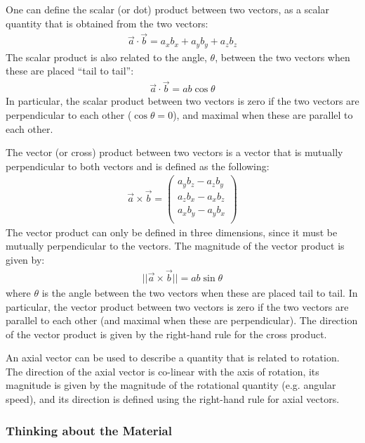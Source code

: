 One can define the scalar (or dot) product between two vectors, as a scalar quantity that is obtained from the two vectors:
\begin{align*}
\vec a \cdot \vec b = a_xb_x + a_yb_y + a_zb_z
\end{align*}
The scalar product is also related to the angle, $\theta$, between the two vectors when these are placed ``tail to tail'':
\begin{align*}
\vec a \cdot \vec b = ab\cos\theta
\end{align*}
In particular, the scalar product between two vectors is zero if the two vectors are perpendicular to each other ($\cos\theta=0$), and maximal when these are parallel to each other.

The vector (or cross) product between two vectors is a vector that is mutually perpendicular to both vectors and is defined as the following:
\begin{align*}
\vec a \times \vec b =\begin{pmatrix}
           a_yb_z - a_z b_y\\
           a_zb_x - a_x b_z\\
           a_xb_y - a_y b_x\\
         \end{pmatrix}
\end{align*}
The vector product can only be defined in three dimensions, since it must be mutually perpendicular to the vectors. The magnitude of the vector product is given by:
\begin{align*}
|| \vec a \times \vec b || = ab\sin\theta
\end{align*}
where $\theta$ is the angle between the two vectors when these are placed tail to tail. In particular, the vector product between two vectors is zero if the two vectors are parallel to each other (and maximal when these are perpendicular). The direction of the vector product is given by the right-hand rule for the cross product.

An axial vector can be used to describe a quantity that is related to rotation. The direction of the axial vector is co-linear with the axis of rotation, its magnitude is given by the magnitude of the rotational quantity (e.g. angular speed), and its direction is defined using the right-hand rule for axial vectors.

\subsubsection{Thinking about the Material}

